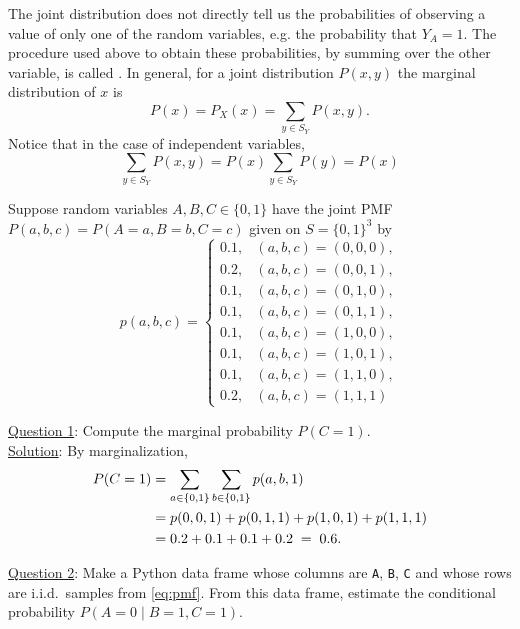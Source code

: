  The joint distribution does not directly tell us the probabilities of observing a value of only one of the random variables, e.g. the probability that $Y_A = 1$. The procedure used above to obtain these probabilities, by summing over the other variable, is called . In general, for a joint distribution $P(x,y)$ the marginal distribution of $x$ is 
 \begin{equation}
 P(x) = P_X(x) = \sum_{y \in S_Y}P(x,y). 
 \end{equation}
 Notice that in the case of independent variables, 
  \begin{equation}
 \sum_{y \in S_Y}P(x,y) = P(x) \sum_{y \in S_Y}P(y) = P(x)
 \end{equation}
 
\begin{example}

Suppose random variables $A,B,C \in \{0,1\}$ have the joint PMF $P(a,b,c)=P(A=a,B=b,C=c)$ given on $S = \{0,1\}^3$ by
\begin{equation}
p(a,b,c)=
\begin{cases}
0.1, & (a,b,c)=(0,0,0),\\
0.2, & (a,b,c)=(0,0,1),\\
0.1, & (a,b,c)=(0,1,0),\\
0.1, & (a,b,c)=(0,1,1),\\
0.1, & (a,b,c)=(1,0,0),\\
0.1, & (a,b,c)=(1,0,1),\\
0.1, & (a,b,c)=(1,1,0),\\
0.2, & (a,b,c)=(1,1,1)
\end{cases}
\label{eq:pmf}
\end{equation}

\noindent
\underline{Question 1}: Compute the marginal probability $P(C=1)$.\\

\noindent
\underline{Solution}: By marginalization,
\begin{align}
P(C=1)
&= \sum_{a\in\{0,1\}}\sum_{b\in\{0,1\}} p(a,b,1) \notag\\
&= p(0,0,1)+p(0,1,1)+p(1,0,1)+p(1,1,1) \notag\\
&= 0.2+0.1+0.1+0.2 \;=\; 0.6.
\label{eq:margC1}
\end{align}

\medskip
\noindent
\underline{Question 2}: Make a Python data frame whose columns are \texttt{A}, \texttt{B}, \texttt{C} and whose rows are i.i.d.\ samples from \eqref{eq:pmf}. From this data frame, estimate the conditional probability $P(A=0 \mid B=1,C=1)$.\\


\end{example}
